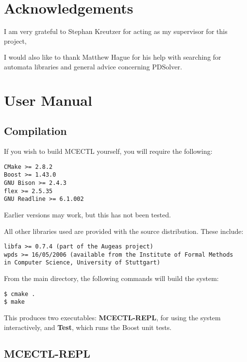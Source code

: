\documentclass[11pt]{article}
\theoremstyle{definition}
\begin{document}
\section{Acknowledgements}

I am very grateful to Stephan Kreutzer for acting as my supervisor for this project, %

I would also like to thank Matthew Hague for his help with searching for
automata libraries and general advice concerning PDSolver.


{}


\appendix
\section{User Manual}

\subsection{Compilation}

If you wish to build MCECTL yourself, you will require the following:
\begin{verbatim}
CMake >= 2.8.2
Boost >= 1.43.0
GNU Bison >= 2.4.3
flex >= 2.5.35
GNU Readline >= 6.1.002
\end{verbatim}

Earlier versions may work, but this has not been tested.

All other libraries used are provided with the source distribution. These include:
\begin{verbatim}
libfa >= 0.7.4 (part of the Augeas project)
wpds >= 16/05/2006 (available from the Institute of Formal Methods 
in Computer Science, University of Stuttgart)
\end{verbatim}

From the main directory, the following commands will build the system:
\begin{verbatim}
$ cmake .
$ make
\end{verbatim}

This produces two executables: \textbf{MCECTL-REPL}, for using the system
interactively, and \textbf{Test}, which runs the Boost unit tests. 

\subsection{MCECTL-REPL}
\end{document}

